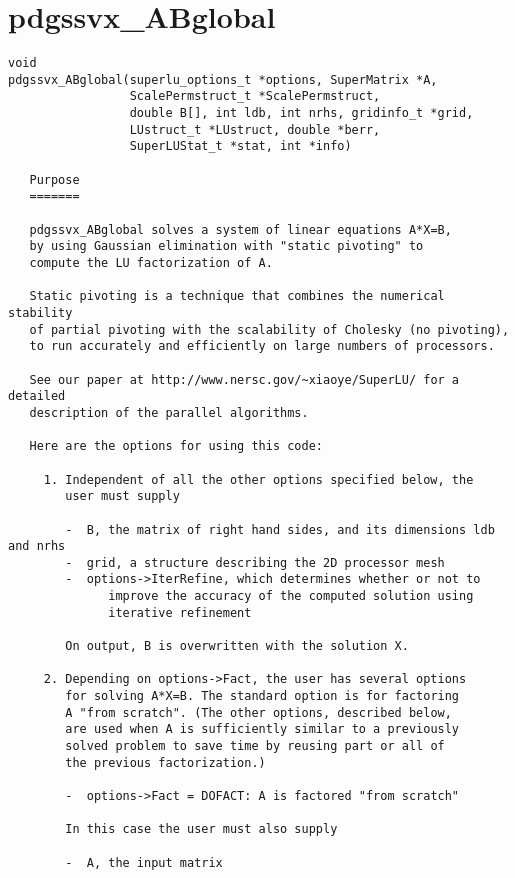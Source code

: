 \section{pdgssvx\_ABglobal}
\begin{verbatim}
void
pdgssvx_ABglobal(superlu_options_t *options, SuperMatrix *A, 
                 ScalePermstruct_t *ScalePermstruct,
                 double B[], int ldb, int nrhs, gridinfo_t *grid,
                 LUstruct_t *LUstruct, double *berr,
                 SuperLUStat_t *stat, int *info)

   Purpose
   =======
  
   pdgssvx_ABglobal solves a system of linear equations A*X=B,
   by using Gaussian elimination with "static pivoting" to
   compute the LU factorization of A.
  
   Static pivoting is a technique that combines the numerical stability
   of partial pivoting with the scalability of Cholesky (no pivoting),
   to run accurately and efficiently on large numbers of processors.
  
   See our paper at http://www.nersc.gov/~xiaoye/SuperLU/ for a detailed
   description of the parallel algorithms.
  
   Here are the options for using this code:
  
     1. Independent of all the other options specified below, the
        user must supply
  
        -  B, the matrix of right hand sides, and its dimensions ldb and nrhs
        -  grid, a structure describing the 2D processor mesh
        -  options->IterRefine, which determines whether or not to
              improve the accuracy of the computed solution using 
              iterative refinement
  
        On output, B is overwritten with the solution X.
  
     2. Depending on options->Fact, the user has several options
        for solving A*X=B. The standard option is for factoring
        A "from scratch". (The other options, described below,
        are used when A is sufficiently similar to a previously 
        solved problem to save time by reusing part or all of 
        the previous factorization.)
  
        -  options->Fact = DOFACT: A is factored "from scratch"
  
        In this case the user must also supply
  
        -  A, the input matrix
  

\end{verbatim}

